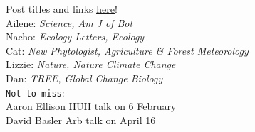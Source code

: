 \documentclass[11pt]{article}
\begin{document}
\vspace{10pt}
 Post titles and links \href{https://docs.google.com/document/d/1j0WdDbjdp8ERLSO7whvtnP-tOblYMlX33TSCXy_uRKo/edit?usp=sharing}{\underline{here}}!\\
Ailene: \emph{Science, Am J of Bot}\\
Nacho: \emph{Ecology Letters, Ecology}\\
Cat: \emph{New Phytologist, Agriculture \& Forest Meteorology}\\
Lizzie: \emph{Nature, Nature Climate Change}\\
Dan: \emph{TREE, Global Change Biology }\\

\vspace{6pt}
\verb|Not to miss|:\\
Aaron Ellison HUH talk on 6 February\\
David Basler Arb talk on April 16\\

\vspace{2ex}
\end{document}
